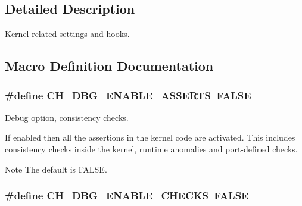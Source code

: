 \subsection{Detailed Description}
Kernel related settings and hooks. 

\subsection{Macro Definition Documentation}
\hypertarget{group__config_gad602fd2546073869a10859158d865b9b}{}
\subsubsection[{C\+H\+\_\+\+D\+B\+G\+\_\+\+E\+N\+A\+B\+L\+E\+\_\+\+A\+S\+S\+E\+R\+T\+S}]{\setlength{\rightskip}{0pt plus 5cm}\#define C\+H\+\_\+\+D\+B\+G\+\_\+\+E\+N\+A\+B\+L\+E\+\_\+\+A\+S\+S\+E\+R\+T\+S~F\+A\+L\+S\+E}\label{group__config_gad602fd2546073869a10859158d865b9b}


Debug option, consistency checks. 

If enabled then all the assertions in the kernel code are activated. This includes consistency checks inside the kernel, runtime anomalies and port-\/defined checks.

\begin{DoxyNote}{Note}
The default is {\ttfamily F\+A\+L\+S\+E}. 
\end{DoxyNote}
\hypertarget{group__config_gaef984ca3bfd8a71478ad55ce6e56a8bb}{}
\subsubsection[{C\+H\+\_\+\+D\+B\+G\+\_\+\+E\+N\+A\+B\+L\+E\+\_\+\+C\+H\+E\+C\+K\+S}]{\setlength{\rightskip}{0pt plus 5cm}\#define C\+H\+\_\+\+D\+B\+G\+\_\+\+E\+N\+A\+B\+L\+E\+\_\+\+C\+H\+E\+C\+K\+S~F\+A\+L\+S\+E}\label{group__config_gaef984ca3bfd8a71478ad55ce6e56a8bb}


